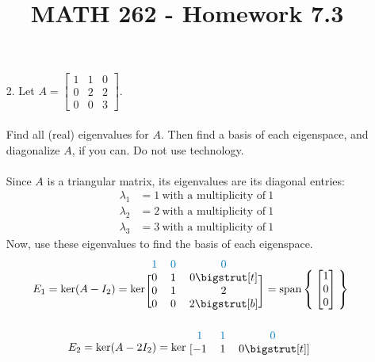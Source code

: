 \documentclass[letterpaper,12pt]{article}
\author{}
\title{MATH 262 - Homework 7.3}
\date{} %
\newcommand{\mat}[1]{
  \begin{bmatrix}
    #1
  \end{bmatrix}
}
\begin{document}
\maketitle

\begin{enumerate}
  \item[2.]
    Let $A = \mat{1 & 1 & 0 \\ 0 & 2 & 2 \\ 0 & 0 & 3}$. \\
    \\
    Find all (real) eigenvalues for $A$. Then find a basis of each eigenspace, and diagonalize $A$, if you can. Do not use technology. \\
    \\
    Since $A$ is a triangular matrix, its eigenvalues are its diagonal entries:
    \begin{align*}
      \lambda_1 &= 1 \ \text{with a multiplicity of} \ 1 \\
      \lambda_2 &= 2 \ \text{with a multiplicity of} \ 1 \\
      \lambda_3 &= 3 \ \text{with a multiplicity of} \ 1
    \end{align*}
    Now, use these eigenvalues to find the basis of each eigenspace. \\
    \begin{align*}
      E_1 &= \text{ker}(A - I_2)
      = \text{ker} \begin{blockarray}{ccc}
        \color{bookblue}{1} & \color{bookblue}{0} & \color{bookblue}{0} \\
        \begin{block}{[ccc]}
          0 & 1 & 0 \bigstrut[t] \\
          0 & 1 & 2 \\
          0 & 0 & 2 \bigstrut[b] \\
        \end{block}
      \end{blockarray}
      = \text{span}\Set{\mat{1 \\ 0 \\ 0}}
    \end{align*}
    \begin{align*}
      E_2 &= \text{ker}(A - 2I_2)
      = \text{ker} \begin{blockarray}{ccc}
        \color{bookblue}{1} & \color{bookblue}{1} & \color{bookblue}{0} \\
        \begin{block}{[ccc]}
          -1 & 1 & 0 \bigstrut[t] \\

\end{block}
\end{blockarray}
\end{align*}
\end{enumerate}
\end{document}
